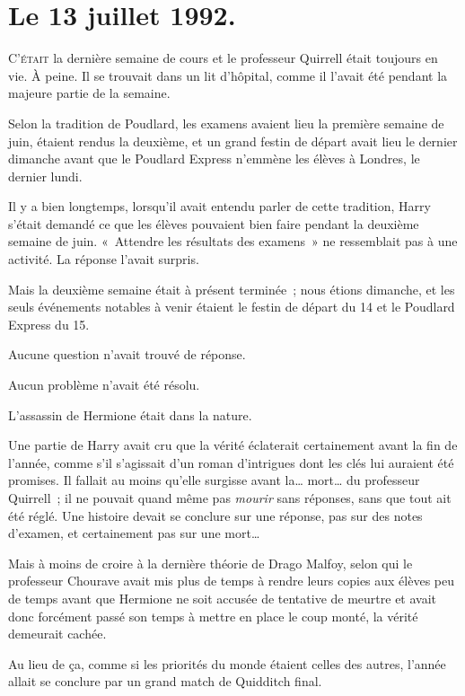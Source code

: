 
\section{Le 13 juillet 1992.}

\lettrine{C}{'était} la dernière semaine de cours et le professeur Quirrell était toujours en vie. À peine. Il se trouvait dans un lit d'hôpital, comme il l'avait été pendant la majeure partie de la semaine.

Selon la tradition de Poudlard, les examens avaient lieu la première semaine de juin, étaient rendus la deuxième, et un grand festin de départ avait lieu le dernier dimanche avant que le Poudlard Express n'emmène les élèves à Londres, le dernier lundi.

Il y a bien longtemps, lorsqu'il avait entendu parler de cette tradition, Harry s'était demandé ce que les élèves pouvaient bien faire pendant la deuxième semaine de juin. «~Attendre les résultats des examens~» ne ressemblait pas à une activité. La réponse l'avait surpris.

Mais la deuxième semaine était à présent terminée~; nous étions dimanche, et les seuls événements notables à venir étaient le festin de départ du 14 et le Poudlard Express du 15.

Aucune question n'avait trouvé de réponse.

Aucun problème n'avait été résolu.

L'assassin de Hermione était dans la nature.

Une partie de Harry avait cru que la vérité éclaterait certainement avant la fin de l'année, comme s'il s'agissait d'un roman d'intrigues dont les clés lui auraient été promises. Il fallait au moins qu'elle surgisse avant la… mort… du professeur Quirrell~; il ne pouvait quand même pas \emph{mourir} sans réponses, sans que tout ait été réglé. Une histoire devait se conclure sur une réponse, pas sur des notes d'examen, et certainement pas sur une mort…

Mais à moins de croire à la dernière théorie de Drago Malfoy, selon qui le professeur Chourave avait mis plus de temps à rendre leurs copies aux élèves peu de temps avant que Hermione ne soit accusée de tentative de meurtre et avait donc forcément passé son temps à mettre en place le coup monté, la vérité demeurait cachée.

Au lieu de ça, comme si les priorités du monde étaient celles des autres, l'année allait se conclure par un grand match de Quidditch final.

